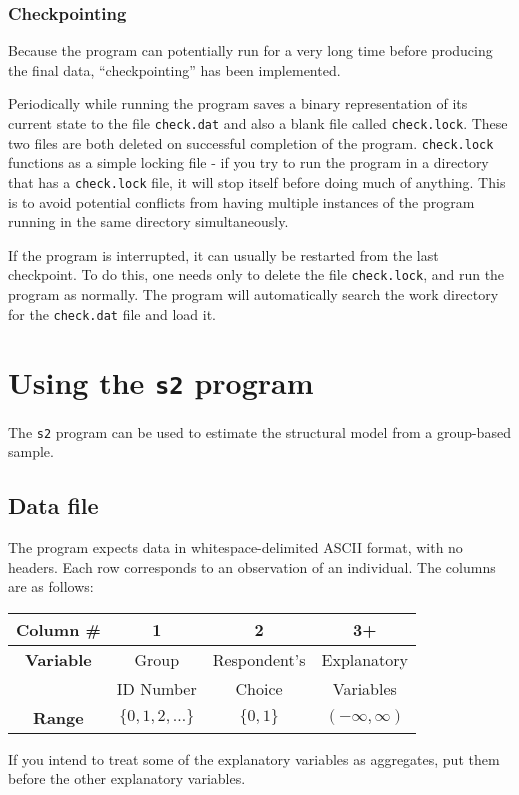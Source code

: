 \documentclass{article}
\begin{document}
\subsubsection{Checkpointing}

Because the program can potentially run for a very long time before producing the final
data, ``checkpointing'' has been implemented.  

Periodically while running the program saves a binary representation of its 
current state to the file {\tt check.dat} and also a blank file called {\tt check.lock}. 
These two files are both deleted on successful completion of the program.
{\tt check.lock} functions as a simple locking file - if you try to run the program in a directory
that has a {\tt check.lock} file, it will stop itself before doing much of anything.  
This is to avoid potential conflicts from having multiple instances of the program 
running in the same directory simultaneously.

If the program is interrupted, it can usually be restarted from the last checkpoint.  To do this,
one needs only to delete the file {\tt check.lock}, and run the program as normally.  
The program will automatically search the work directory for the {\tt check.dat} file and load 
it.  


\section{Using the {\tt s2} program}\label{sec:s2}

The {\tt s2} program can be used to estimate the structural model from a group-based sample.

\subsection{Data file}

The program expects data in whitespace-delimited ASCII format, with
no headers.  Each row corresponds to an observation of an individual.
The columns are as follows:
\begin{center}
\begin{tabular}{|c|c|c|c|}
\hline
{\footnotesize {\bf Column \# }} & {\footnotesize \bf 1} & {\footnotesize 2} & {\footnotesize 3+} \\ 
\hline
{\footnotesize {\bf Variable }} & {\footnotesize Group } & {\footnotesize Respondent's} & {\footnotesize Explanatory} \\
                                & {\footnotesize ID Number}     & {\footnotesize Choice      } & {\footnotesize Variables} \\
\hline
{\footnotesize {\bf Range }} & {\footnotesize $\{0,1,2,\ldots\}$} & {\footnotesize $\{0,1\}$} & {\footnotesize $(-\infty,\infty)$} \\
\hline
\end{tabular}
\end{center}
If you intend to treat some of the explanatory variables as aggregates, put them 
before the other explanatory variables.
\end{document}
